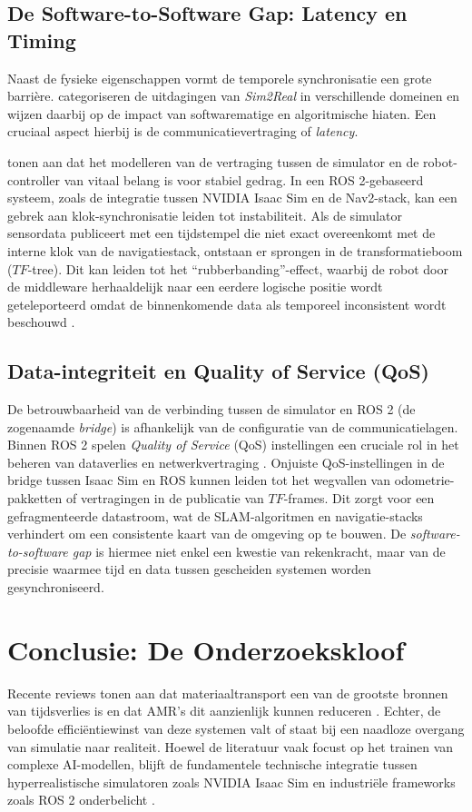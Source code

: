 \subsection{De Software-to-Software Gap: Latency en Timing}
Naast de fysieke eigenschappen vormt de temporele synchronisatie een grote barrière. \textcite{Hoefer2021} categoriseren de uitdagingen van \textit{Sim2Real} in verschillende domeinen en wijzen daarbij op de impact van softwarematige en algoritmische hiaten. Een cruciaal aspect hierbij is de communicatievertraging of \textit{latency}.

\textcite{Peng2020} tonen aan dat het modelleren van de vertraging tussen de simulator en de robot-controller van vitaal belang is voor stabiel gedrag. In een ROS 2-gebaseerd systeem, zoals de integratie tussen NVIDIA Isaac Sim en de Nav2-stack, kan een gebrek aan klok-synchronisatie leiden tot instabiliteit. Als de simulator sensordata publiceert met een tijdstempel die niet exact overeenkomt met de interne klok van de navigatiestack, ontstaan er sprongen in de transformatieboom ($TF$-tree). Dit kan leiden tot het ``rubberbanding''-effect, waarbij de robot door de middleware herhaaldelijk naar een eerdere logische positie wordt geteleporteerd omdat de binnenkomende data als temporeel inconsistent wordt beschouwd \autocite{Peng2020}.

\subsection{Data-integriteit en Quality of Service (QoS)}
De betrouwbaarheid van de verbinding tussen de simulator en ROS 2 (de zogenaamde \textit{bridge}) is afhankelijk van de configuratie van de communicatielagen. Binnen ROS 2 spelen \textit{Quality of Service} (QoS) instellingen een cruciale rol in het beheren van dataverlies en netwerkvertraging \autocite{Robotics2026}. Onjuiste QoS-instellingen in de bridge tussen Isaac Sim en ROS kunnen leiden tot het wegvallen van odometrie-pakketten of vertragingen in de publicatie van $TF$-frames. Dit zorgt voor een gefragmenteerde datastroom, wat de SLAM-algoritmen en navigatie-stacks verhindert om een consistente kaart van de omgeving op te bouwen. De \textit{software-to-software gap} is hiermee niet enkel een kwestie van rekenkracht, maar van de precisie waarmee tijd en data tussen gescheiden systemen worden gesynchroniseerd.

\section{Conclusie: De Onderzoekskloof}
Recente reviews tonen aan dat materiaaltransport een van de grootste bronnen van tijdsverlies is en dat AMR's dit aanzienlijk kunnen reduceren \autocite{Sodiya2024}. Echter, de beloofde efficiëntiewinst van deze systemen valt of staat bij een naadloze overgang van simulatie naar realiteit. Hoewel de literatuur vaak focust op het trainen van complexe AI-modellen, blijft de fundamentele technische integratie tussen hyperrealistische simulatoren zoals NVIDIA Isaac Sim en industriële frameworks zoals ROS 2 onderbelicht \autocite{Keith2024}.

